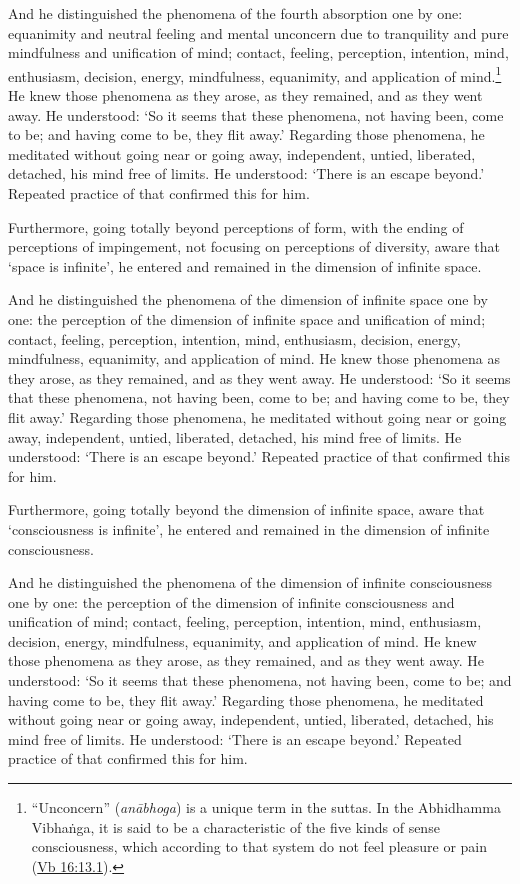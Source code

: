 \documentclass[12pt,openany]{book}%
\begin{document}
And he distinguished the phenomena of the fourth absorption one by one: equanimity and neutral feeling and mental unconcern due to tranquility and pure mindfulness and unification of mind; contact, feeling, perception, intention, mind, enthusiasm, decision, energy, mindfulness, equanimity, and application of mind.\footnote{“Unconcern” (\textit{\textsanskrit{anābhoga}}) is a unique term in the suttas. In the Abhidhamma \textsanskrit{Vibhaṅga}, it is said to be a characteristic of the five kinds of sense consciousness, which according to that system do not feel pleasure or pain (\href{https://suttacentral.net/vb16/en/sujato\#13.1}{Vb 16:13.1}). } He knew those phenomena as they arose, as they remained, and as they went away. He understood: ‘So it seems that these phenomena, not having been, come to be; and having come to be, they flit away.’ Regarding those phenomena, he meditated without going near or going away, independent, untied, liberated, detached, his mind free of limits. He understood: ‘There is an escape beyond.’ Repeated practice of that confirmed this for him. 

Furthermore, going totally beyond perceptions of form, with the ending of perceptions of impingement, not focusing on perceptions of diversity, aware that ‘space is infinite’, he entered and remained in the dimension of infinite space. 

And he distinguished the phenomena of the dimension of infinite space one by one: the perception of the dimension of infinite space and unification of mind; contact, feeling, perception, intention, mind, enthusiasm, decision, energy, mindfulness, equanimity, and application of mind. He knew those phenomena as they arose, as they remained, and as they went away. He understood: ‘So it seems that these phenomena, not having been, come to be; and having come to be, they flit away.’ Regarding those phenomena, he meditated without going near or going away, independent, untied, liberated, detached, his mind free of limits. He understood: ‘There is an escape beyond.’ Repeated practice of that confirmed this for him. 

Furthermore, going totally beyond the dimension of infinite space, aware that ‘consciousness is infinite’, he entered and remained in the dimension of infinite consciousness. 

And he distinguished the phenomena of the dimension of infinite consciousness one by one: the perception of the dimension of infinite consciousness and unification of mind; contact, feeling, perception, intention, mind, enthusiasm, decision, energy, mindfulness, equanimity, and application of mind. He knew those phenomena as they arose, as they remained, and as they went away. He understood: ‘So it seems that these phenomena, not having been, come to be; and having come to be, they flit away.’ Regarding those phenomena, he meditated without going near or going away, independent, untied, liberated, detached, his mind free of limits. He understood: ‘There is an escape beyond.’ Repeated practice of that confirmed this for him. 
\end{document}
